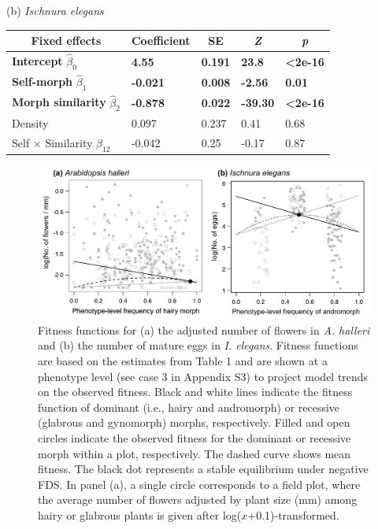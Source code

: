 \documentclass[12pt,]{article}
\begin{document}
\begin{table}[ht]
(b) \textit{Ischnura elegans} \\
\begin{tabular}{lllll}
\hline
\multicolumn{1}{c}{Fixed   effects} & \multicolumn{1}{c}{Coefficient} & \multicolumn{1}{c}{SE} & \multicolumn{1}{c}{\textit{Z}} & \multicolumn{1}{c}{\textit{p}} \\ \hline
\textbf{Intercept} $\hat{\beta}_{0}$    & \textbf{4.55} &  \textbf{0.191} & \textbf{23.8}  & \textbf{\textless{}2e-16}  \\
\textbf{Self-morph} $\hat{\beta}_{1}$               & \textbf{-0.021}                 & \textbf{0.008}         & \textbf{-2.56}                 & \textbf{0.01}                  \\
\textbf{Morph similarity} $\hat{\beta}_{2}$           & \textbf{-0.878}                 & \textbf{0.022}         & \textbf{-39.30}                & \textbf{\textless{}2e-16}      \\
Density                             & 0.097                           & 0.237                  & 0.41                           & 0.68                           \\
Self $\times$ Similarity $\hat{\beta}_{12}$                 & -0.042                          & 0.25                 & -0.17                          & 0.87                           \\ \hline
\end{tabular}
\label{table1:GLMM}
\end{table}

\begin{figure}[ht]
  \includegraphics[width=\linewidth]{Ah_Ie_plots.pdf}
  \caption{Fitness functions for (a) the adjusted number of flowers in \textit{A. halleri} and (b) the number of mature eggs in \textit{I. elegans}. Fitness functions are based on the estimates from Table 1 and are shown at a phenotype level (see case 3 in Appendix S3) to project model trends on the observed fitness. Black and white lines indicate the fitness function of dominant (i.e., hairy and andromorph) or recessive (glabrous and gynomorph) morphs, respectively. Filled and open circles indicate the observed fitness for the dominant or recessive morph within a plot, respectively. The dashed curve shows mean fitness. The black dot represents a stable equilibrium under negative FDS. In panel (a), a single circle corresponds to a field plot, where the average number of flowers adjusted by plant size (mm) among hairy or glabrous plants is given after log($x$+0.1)-transformed.}
  \label{fig4:GLMM}
\end{figure}
\end{document}
